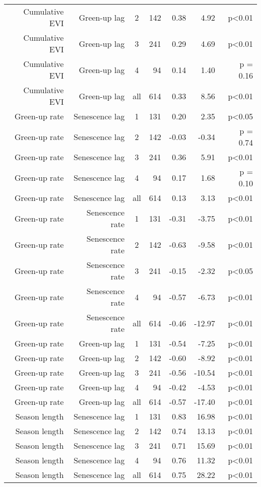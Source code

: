 \begin{table}[H]
\begin{tabular}{rrcrrrr}
  Cumulative EVI & Green-up lag & 2 & 142 & 0.38 & 4.92 & p<0.01 \\ 
  Cumulative EVI & Green-up lag & 3 & 241 & 0.29 & 4.69 & p<0.01 \\ 
  Cumulative EVI & Green-up lag & 4 &  94 & 0.14 & 1.40 & p = 0.16 \\ 
  Cumulative EVI & Green-up lag & all & 614 & 0.33 & 8.56 & p<0.01 \\ 
   \hline
Green-up rate & Senescence lag & 1 & 131 & 0.20 & 2.35 & p<0.05 \\ 
  Green-up rate & Senescence lag & 2 & 142 & -0.03 & -0.34 & p = 0.74 \\ 
  Green-up rate & Senescence lag & 3 & 241 & 0.36 & 5.91 & p<0.01 \\ 
  Green-up rate & Senescence lag & 4 &  94 & 0.17 & 1.68 & p = 0.10 \\ 
  Green-up rate & Senescence lag & all & 614 & 0.13 & 3.13 & p<0.01 \\ 
   \hline
Green-up rate & Senescence rate & 1 & 131 & -0.31 & -3.75 & p<0.01 \\ 
  Green-up rate & Senescence rate & 2 & 142 & -0.63 & -9.58 & p<0.01 \\ 
  Green-up rate & Senescence rate & 3 & 241 & -0.15 & -2.32 & p<0.05 \\ 
  Green-up rate & Senescence rate & 4 &  94 & -0.57 & -6.73 & p<0.01 \\ 
  Green-up rate & Senescence rate & all & 614 & -0.46 & -12.97 & p<0.01 \\ 
   \hline
Green-up rate & Green-up lag & 1 & 131 & -0.54 & -7.25 & p<0.01 \\ 
  Green-up rate & Green-up lag & 2 & 142 & -0.60 & -8.92 & p<0.01 \\ 
  Green-up rate & Green-up lag & 3 & 241 & -0.56 & -10.54 & p<0.01 \\ 
  Green-up rate & Green-up lag & 4 &  94 & -0.42 & -4.53 & p<0.01 \\ 
  Green-up rate & Green-up lag & all & 614 & -0.57 & -17.40 & p<0.01 \\ 
   \hline
Season length & Senescence lag & 1 & 131 & 0.83 & 16.98 & p<0.01 \\ 
  Season length & Senescence lag & 2 & 142 & 0.74 & 13.13 & p<0.01 \\ 
  Season length & Senescence lag & 3 & 241 & 0.71 & 15.69 & p<0.01 \\ 
  Season length & Senescence lag & 4 &  94 & 0.76 & 11.32 & p<0.01 \\ 
  Season length & Senescence lag & all & 614 & 0.75 & 28.22 & p<0.01 \\ 

\end{tabular}
\end{table}
